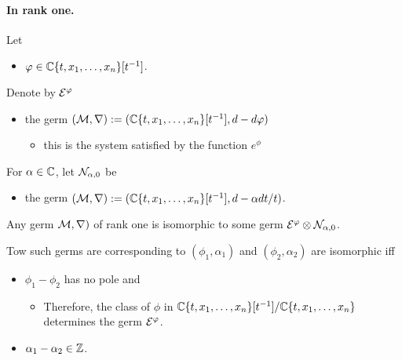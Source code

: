 \paragraph{In rank one.}
Let
\begin{itemize}
  \item $\varphi\in\mathbb{C}\{t,x_1,\dots,x_n\}[t^{-1}]$.
\end{itemize}
Denote by $\mathcal{E}^{\varphi}$
\begin{itemize}
  \item the germ $(\mathcal{M},\nabla):=(\mathbb{C}\{t,x_1,\dots,x_n\}[t^{-1}],d-d\varphi)$
    \begin{itemize}
      \item this is the system satisfied by the function $e^\phi$
    \end{itemize}
\end{itemize}
For $\alpha\in\mathbb{C}$, let $\mathcal{N}_{\alpha,0}$ be
\begin{itemize}
  \item the germ
    $(\mathcal{M},\nabla):=(\mathbb{C}\{t,x_1,\dots,x_n\}[t^{-1}],d-\alpha dt/t)$.
\end{itemize}
\begin{prop}
  Any germ $\mathcal{M},\nabla)$ of rank one is isomorphic to some germ
  $\mathcal{E}^{\varphi}\otimes\mathcal{N}_{\alpha,0}$.

  Tow such germs are corresponding to $(\phi_1,\alpha_1)$ and
  $(\phi_2,\alpha_2)$ are isomorphic iff
  \begin{itemize}
    \item $\phi_1-\phi_2$ has no pole and
      \begin{itemize}
        \item Therefore, the class of $\phi$ in
          $\mathbb{C}\{t,x_1,\dots,x_n\}[t^{-1}]/\mathbb{C}\{t,x_1,\dots,x_n\}$ determines the
          germ $\mathcal{E}^\varphi$.
      \end{itemize}
    \item $\alpha_1-\alpha_2\in\mathbb{Z}$.
  \end{itemize}
\end{prop}
